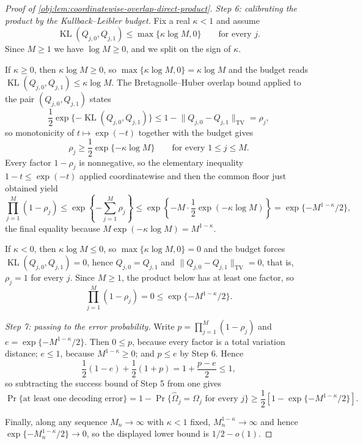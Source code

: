 \documentclass[11pt]{article}
\begin{document}
\begin{proof}[Proof of \cref{obj:lem:coordinatewise-overlap-direct-product}]
\emph{Step 6: calibrating the product by the Kullback--Leibler budget.}
Fix a real \(\kappa<1\) and assume
\[
\operatorname{KL}(Q_{j,0},Q_{j,1})\leq\max\{\kappa\log M,0\}
\qquad\text{for every }j .
\]
Since \(M\geq1\) we have \(\log M\geq0\), and we split on the sign of \(\kappa\).

If \(\kappa\geq0\), then \(\kappa\log M\geq0\), so \(\max\{\kappa\log M,0\}=\kappa\log M\) and the budget reads \(\operatorname{KL}(Q_{j,0},Q_{j,1})\leq\kappa\log M\). The Bretagnolle--Huber overlap bound applied to the pair \((Q_{j,0},Q_{j,1})\) states
\[
\frac12\exp\{-\operatorname{KL}(Q_{j,0},Q_{j,1})\}
\leq
1-\lVert Q_{j,0}-Q_{j,1}\rVert_{\mathrm{TV}}
=\rho_j,
\]
so monotonicity of \(t\mapsto\exp(-t)\) together with the budget gives
\[
\rho_j\geq\frac12\exp\{-\kappa\log M\}
\qquad\text{for every }1\leq j\leq M .
\]
Every factor \(1-\rho_j\) is nonnegative, so the elementary inequality \(1-t\leq\exp(-t)\) applied coordinatewise and then the common floor just obtained yield
\[
\prod_{j=1}^M(1-\rho_j)
\leq
\exp\left\{-\sum_{j=1}^M\rho_j\right\}
\leq
\exp\left\{-M\cdot\frac12\exp(-\kappa\log M)\right\}
=
\exp\{-M^{1-\kappa}/2\},
\]
the final equality because \(M\exp(-\kappa\log M)=M^{1-\kappa}\).

If \(\kappa<0\), then \(\kappa\log M\leq0\), so \(\max\{\kappa\log M,0\}=0\) and the budget forces \(\operatorname{KL}(Q_{j,0},Q_{j,1})=0\), hence \(Q_{j,0}=Q_{j,1}\) and \(\lVert Q_{j,0}-Q_{j,1}\rVert_{\mathrm{TV}}=0\), that is, \(\rho_j=1\) for every \(j\). Since \(M\geq1\), the product below has at least one factor, so
\[
\prod_{j=1}^M(1-\rho_j)=0\leq\exp\{-M^{1-\kappa}/2\}.
\]

\emph{Step 7: passing to the error probability.}
Write \(p=\prod_{j=1}^M(1-\rho_j)\) and \(e=\exp\{-M^{1-\kappa}/2\}\). Then \(0\leq p\), because every factor is a total variation distance; \(e\leq1\), because \(M^{1-\kappa}\geq0\); and \(p\leq e\) by Step 6. Hence
\[
\frac12(1-e)+\frac12(1+p)=1+\frac{p-e}{2}\leq1,
\]
so subtracting the success bound of Step 5 from one gives
\[
\Pr\{\text{at least one decoding error}\}
=
1-\Pr\{\widehat\Omega_j=\Omega_j\text{ for every }j\}
\geq
\frac12\left[1-\exp\{-M^{1-\kappa}/2\}\right].
\]

Finally, along any sequence \(M_n\to\infty\) with \(\kappa<1\) fixed, \(M_n^{1-\kappa}\to\infty\) and hence \(\exp\{-M_n^{1-\kappa}/2\}\to0\), so the displayed lower bound is \(1/2-o(1)\).
\end{proof}
\end{document}
